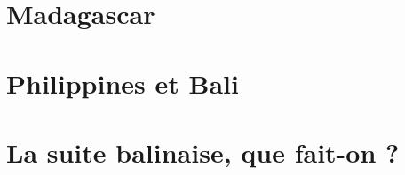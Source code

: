 \chapter{Madagascar}

\pagebreak
\pagebreak
\pagebreak

\chapter{Philippines et Bali}

\pagebreak
\pagebreak
\pagebreak
\pagebreak

\chapter{La suite balinaise, que fait-on ?}


\backmatter



